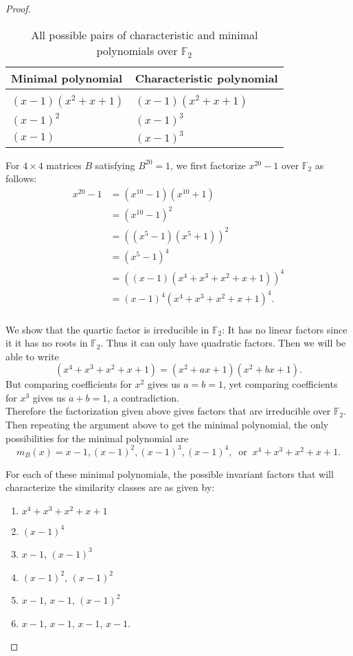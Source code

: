 \documentclass{article}
\begin{document}
\begin{proof}
    \begin{table}[h]
    \centering
    \begin{tabular}{ll}
      Minimal polynomial &Characteristic polynomial\\\hline\\
      $(x-1)(x^2+x+1)$ &$(x-1)(x^2+x+1)$\\
      $(x-1)^2$ &$(x-1)^3$\\
      $(x-1)$ &$(x-1)^3$\\
    \end{tabular}
    \caption{All possible pairs of characteristic and minimal polynomials
      over $\mathbb{F}_2$}
    \label{tbl:A2}
    \end{table}

    For $4\times4$ matrices $B$ satisfying $B^{20}=1$, we first factorize
    $x^{20}-1$ over $\mathbb{F}_2$ as follows:
    \begin{align*}
      x^{20}-1 &=(x^{10}-1)(x^{10}+1)\\
      &=(x^{10}-1)^2\\
      &=((x^{5}-1)(x^{5}+1))^2\\
      &=(x^{5}-1)^4\\
      &=((x-1)(x^4+x^3+x^2+x+1))^4\\
      &=(x-1)^4(x^4+x^3+x^2+x+1)^4.\\
    \end{align*}

    We show that the quartic factor is irreducible in $\mathbb{F}_2$: It
    has no linear factors since it it has no roots in $\mathbb{F}_2$. Thus
    it can only have quadratic factors. Then we will be able to write 
    \[(x^4+x^3+x^2+x+1) =(x^2+ax+1)(x^2+bx+1).\]
    But comparing coefficients for $x^2$ gives us $a=b=1$, yet comparing
    coefficients for $x^3$ gives us $a+b=1$, a contradiction. \\

    Therefore the factorization given above gives factors that are
    irreducible over $\mathbb{F}_2$. Then repeating the argument above to
    get the minimal polynomial, the only possibilities for the minimal
    polynomial are
    \[m_B(x)=x-1, (x-1)^2, (x-1)^3, (x-1)^4,\;\; \text{or}\;\;
    x^4+x^3+x^2+x+1.\]

    For each of these minimal polynomials, the possible invariant factors
    that will characterize the similarity classes are as given by:
    \begin{enumerate}
      \item $x^4+x^3+x^2+x+1$
      \item $(x-1)^4$
      \item $x-1$, $(x-1)^3$
      \item $(x-1)^2$, $(x-1)^2$
      \item $x-1$, $x-1$, $(x-1)^2$
      \item $x-1$, $x-1$, $x-1$, $x-1$.
    \end{enumerate}
  \end{proof}
\end{document}
